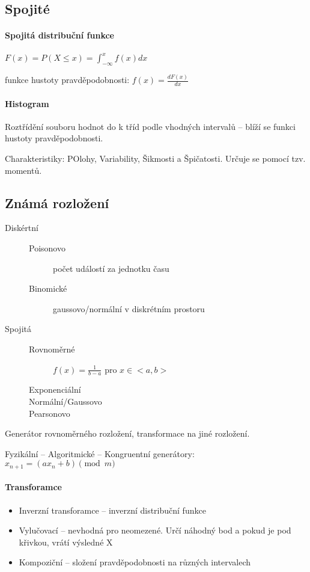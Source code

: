 \documentclass[a4wide]{report}
\begin{document}
\subsection{Spojité}

\paragraph{Spojitá distribuční funkce}
$F(x) = P(X \leq x) = \int^x_{-\infty} f(x) dx$

funkce hustoty pravděpodobnosti: $f(x) = \frac{dF(x)}{dx}$

\paragraph{Histogram}
Roztřídění souboru hodnot do k tříd podle vhodných intervalů -- blíží se funkci hustoty pravděpodobnosti.

Charakteristiky: POlohy, Variability, Šikmosti a Špičatosti. Určuje se pomocí tzv. momentů.

\subsection{Známá rozložení}
\begin{description}
	\item[Diskértní] \hfill
	\begin{description}
		\item[Poisonovo] počet událostí za jednotku času
		\item[Binomické] gaussovo/normální v diskrétním prostoru
	\end{description}
	\item[Spojitá] \hfill
	\begin{description}
		\item[Rovnoměrné] $f(x) = \frac{1}{b-a}$ pro $x \in <a,b>$
		\item[Exponenciální]
		\item[Normální/Gaussovo]
		\item[Pearsonovo]
	\end{description}
\end{description}

Generátor rovnoměrného rozložení, transformace na jiné rozložení.

Fyzikální -- Algoritmické -- Kongruentní generátory: $x_{n+1} = (ax_n+b)\pmod m$

\paragraph{Transforamce}
\begin{itemize}
	\item Inverzní transforamce -- inverzní distribuční funkce
	\item Vylučovací -- nevhodná pro neomezené. Určí náhodný bod a pokud je pod křivkou, vrátí výsledné X
	\item Kompoziční -- složení pravděpodobnosti na různých intervalech
\end{itemize}
\end{document}
